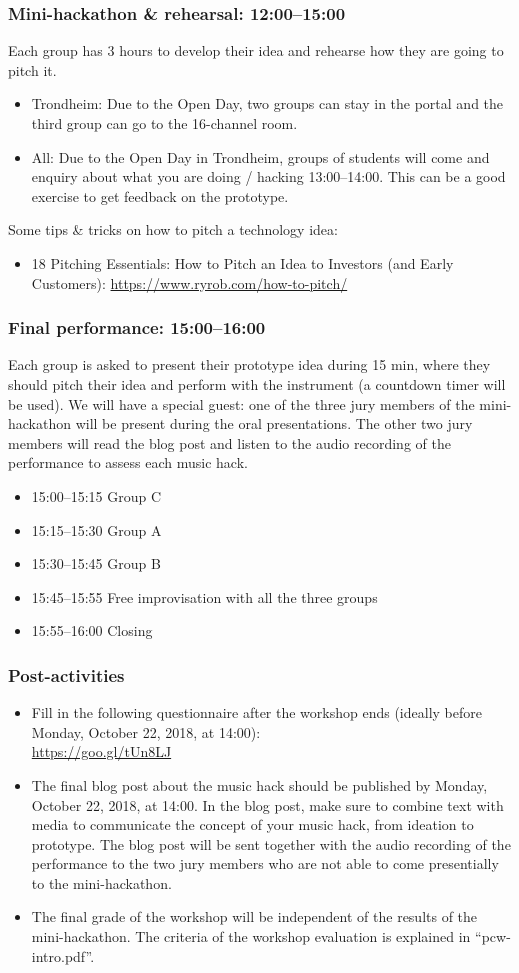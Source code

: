 \documentclass[screen, aspectratio=43]{beamer}
\begin{document}
\begin{frame}
  \frametitle{Mini-hackathon \& rehearsal: 12:00--15:00}
  Each group has 3 hours to develop their idea and rehearse how they are going to pitch it. 
    \begin{itemize}
    	\item Trondheim: Due to the Open Day, two groups can stay in the portal and the third group can go to the 16-channel room.
	\item All: Due to the Open Day in Trondheim, groups of students will come and enquiry about what you are doing / hacking 13:00--14:00. This can be a good exercise to get feedback on the prototype.
    \end{itemize}
    {\tiny Some tips \& tricks on how to pitch a technology idea:
     \begin{itemize}
    	\item 18 Pitching Essentials: How to Pitch an Idea to Investors (and Early Customers): \url{https://www.ryrob.com/how-to-pitch/}
      \end{itemize}	
    }
\end{frame}
%
\begin{frame}
  \frametitle{Final performance: 15:00--16:00}
  Each group is asked to present their prototype idea during 15 min, where they should pitch their idea and perform with the instrument (a countdown timer will be used). We will have a special guest: one of the three jury members of the mini-hackathon will be present during the oral presentations. The other two jury members will read the blog post and listen to the audio recording of the performance to assess each music hack.
    \begin{itemize}
    	\item 15:00--15:15 Group C
	\item 15:15--15:30 Group A
	\item 15:30--15:45 Group B
	\item 15:45--15:55 Free improvisation with all the three groups
	\item 15:55--16:00 Closing
    \end{itemize}
\end{frame}
%
\begin{frame}
  \frametitle{Post-activities}
    \begin{itemize}
         \item Fill in the following questionnaire after the workshop ends (ideally before Monday, October 22, 2018, at 14:00): \\
 	\url{https://goo.gl/tUn8LJ}       
    	\item The final blog post about the music hack should be published by Monday, October 22, 2018, at 14:00. In the blog post, make sure to combine text with media to communicate the concept of your music hack, from ideation to prototype. The blog post will be sent together with the audio recording of the performance to the two jury members who are not able to come presentially to the mini-hackathon.
	\item The final grade of the workshop will be independent of the results of the mini-hackathon. The criteria of the workshop evaluation is explained in ``pcw-intro.pdf''.
    \end{itemize}
\end{frame}
\end{document}

